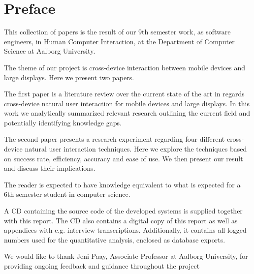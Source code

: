 \section*{Preface}
This collection of papers is the result of our 9th semester work, as software engineers, in Human Computer Interaction, at the Department of Computer Science at Aalborg University.

The theme of our project is cross-device interaction between mobile devices and large displays. Here we present two papers. 

The first paper is a literature review over the current state of the art in regards cross-device natural user interaction for mobile devices and large displays. In this work we analytically summarized relevant research outlining the current field and potentially identifying knowledge gaps. 

The second paper presents a research experiment regarding four different cross-device natural user interaction techniques. Here we explore the techniques based on success rate, efficiency, accuracy and ease of use. We then present our result and discuss their implications.

The reader is expected to have knowledge equivalent to what is expected for a 6th semester student in computer science.

A CD containing the source code of the developed systems is supplied together with this report. The CD also contains a digital copy of this report as well as appendices with e.g. interview transcriptions. Additionally, it contains all logged numbers used for the quantitative analysis, enclosed as database exports.

We would like to thank Jeni Paay, Associate Professor at Aalborg University, for providing ongoing feedback and guidance throughout the project